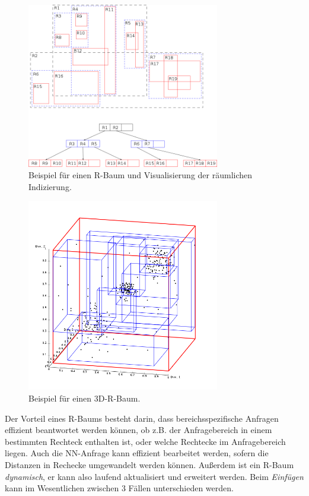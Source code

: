 \begin{figure}[ht]
	\centering
	\includegraphics[width=0.75\textwidth]{Figures/r_tree}
	\caption[R-Baum 2D]{Beispiel für einen R-Baum und Visualisierung der
	räumlichen Indizierung.\footnotemark}
	\label{fig:r_tree}
\end{figure}

\begin{figure}[ht]
	\centering
	\includegraphics[width=0.75\textwidth]{Figures/r_tree3D}
	\caption[R-Baum 3D]{Beispiel für einen 3D-R-Baum.\footnotemark}
	\label{fig:r_tree3D}
\end{figure}

Der Vorteil eines R-Baums besteht darin, dass bereichsspezifische Anfragen effizient
beantwortet werden können, ob z.B. der Anfragebereich in einem bestimmten Rechteck
enthalten ist, oder welche Rechtecke im Anfragebereich liegen. Auch die NN-Anfrage
kann effizient bearbeitet werden,
sofern die Distanzen in Rechecke umgewandelt werden können.
Außerdem ist ein R-Baum \textit{dynamisch}, er 	kann also laufend
aktualisiert und erweitert werden. Beim \textit{Einfügen} kann im Wesentlichen
zwischen 3 Fällen unterschieden werden. 

